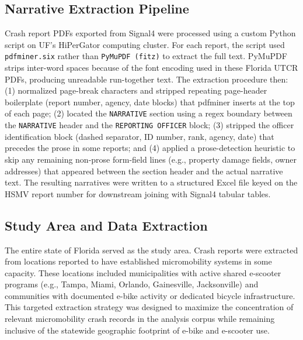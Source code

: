 \documentclass[numbered]{trbunofficial}
\begin{document}
\subsection{Narrative Extraction Pipeline}

Crash report PDFs exported from Signal4 were processed using a custom Python script on UF's HiPerGator computing cluster. For each report, the script used \texttt{pdfminer.six} rather than \texttt{PyMuPDF (fitz)} to extract the full text. PyMuPDF strips inter-word spaces because of the font encoding used in these Florida UTCR PDFs, producing unreadable run-together text. The extraction procedure then: (1) normalized page-break characters and stripped repeating page-header boilerplate (report number, agency, date blocks) that pdfminer inserts at the top of each page; (2) located the \texttt{NARRATIVE} section using a regex boundary between the \texttt{NARRATIVE} header and the \texttt{REPORTING OFFICER} block; (3) stripped the officer identification block (dashed separator, ID number, rank, agency, date) that precedes the prose in some reports; and (4) applied a prose-detection heuristic to skip any remaining non-prose form-field lines (e.g., property damage fields, owner addresses) that appeared between the section header and the actual narrative text. The resulting narratives were written to a structured Excel file keyed on the HSMV report number for downstream joining with Signal4 tabular tables.

\subsection{Study Area and Data Extraction}

The entire state of Florida served as the study area. Crash reports were extracted from locations reported to have established micromobility systems in some capacity. These locations included municipalities with active shared e-scooter programs (e.g., Tampa, Miami, Orlando, Gainesville, Jacksonville) and communities with documented e-bike activity or dedicated bicycle infrastructure. This targeted extraction strategy was designed to maximize the concentration of relevant micromobility crash records in the analysis corpus while remaining inclusive of the statewide geographic footprint of e-bike and e-scooter use.
\end{document}
